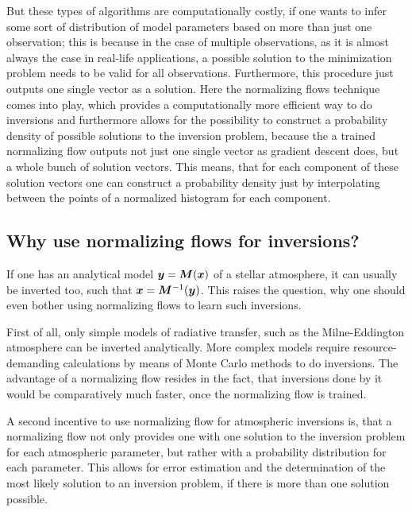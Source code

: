 \documentclass[a4paper,12pt]{report}
\begin{document}
But these types of algorithms are computationally costly, if one wants to infer some sort of distribution of model parameters based on more than just one observation; this is because in the case of multiple observations, as it is almost always the case in real-life applications, a possible solution to the minimization problem needs to be valid for all observations. Furthermore, this procedure just outputs one single vector as a solution. Here the normalizing flows technique comes into play, which provides a computationally more efficient way to do inversions and furthermore allows for the possibility to construct a probability density of possible solutions to the inversion problem, because the a trained normalizing flow outputs not just one single vector as gradient descent does, but a whole bunch of solution vectors. This means, that for each component of these solution vectors one can construct a probability density just by interpolating between the points of a normalized histogram for each component.

\subsection{Why use normalizing flows for inversions?}
If one has an analytical model $\bm{y} = \bm{M}(\bm{x})$ of a stellar atmosphere, it can usually be inverted too, such that $\bm{x} = \bm{M}^{-1}(\bm{y})$. This raises the question, why one should even bother using normalizing flows to learn such inversions.

First of all, only simple models of radiative transfer, such as the Milne-Eddington atmosphere can be inverted analytically. More complex models require resource-demanding calculations by means of Monte Carlo methods to do inversions. The advantage of a normalizing flow resides in the fact, that inversions done by it would be comparatively much faster, once the normalizing flow is trained.

A second incentive to use normalizing flow for atmospheric inversions is, that a normalizing flow not only provides one with one solution to the inversion problem for each atmospheric parameter, but rather with a probability distribution for each parameter. This allows for error estimation and the determination of the most likely solution to an inversion problem, if there is more than one solution possible.
\end{document}
